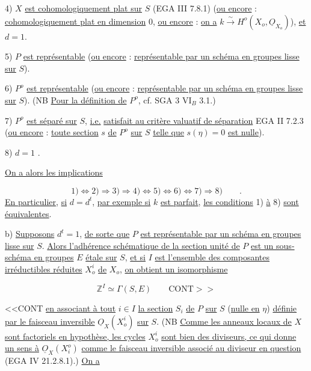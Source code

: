 
4) $X$ \underline{est cohomologiquement plat sur} $S$ (EGA III 7.8.1) (\underline{ou encore} : \underline{cohomologiquement plat en dimension} $0$, \underline{ou encore} : \underline{on a} $k \stackrel{\sim}{\longrightarrow} H^o(X_o,\underline{O}_{X_o})$), \underline{et} $d=1$.

5) $P$ \underline{est représentable} (\underline{ou encore} : \underline{représentable par un schéma en groupes lisse sur} $S$).

6) $P^o$ \underline{est représentable} (\underline{ou encore} : \underline{représentable par un schéma en groupes lisse sur} $S$). (NB \underline{Pour la définition de} $P^o$, cf. SGA 3 $\mathrm{VI}_B$ 3.1.)

7) $P^o$ \underline{est séparé sur} $S$, \underline{i.e.} \underline{satisfait au critère valuatif de séparation} EGA II 7.2.3 (\underline{ou encore} : \underline{toute section} $s$ \underline{de} $P^o$ \underline{sur} $S$ \underline{telle que} $s(\eta) = 0$ \underline{est nulle}).

8) $d=1$ .

\underline{On a alors les implications}

\begin{equation}\tag{12.1.4}
1) \Longleftrightarrow 2) \Longrightarrow 3) \Longrightarrow 4) \Longleftrightarrow 5) \Longleftrightarrow 6) \Longleftrightarrow 7) \Longrightarrow 8) \qquad .
\end{equation}
\underline{En particulier}, \underline{si} $d=d^t$, \underline{par exemple si} $k$ \underline{est parfait}, \underline{les conditions} 1) \underline{à} 8) \underline{sont équivalentes}.

b) \underline{Supposons} $d^t=1$, \underline{de sorte que} $P$ \underline{est représentable par un schéma en groupes lisse sur} $S$. \underline{Alors l'adhérence schématique de la section unité de} $P$ \underline{est un sous-schéma en groupes} $E$ \underline{étale sur} $S$, \underline{et si} $I$ \underline{est l'ensemble des composantes irréductibles réduites} $X_o^i$ \underline{de} $X_o$, \underline{on obtient un isomorphisme}

\begin{equation}\tag{12.1.5}
\mathbb{Z}^I \simeq \Gamma(S,E) \qquad \mathrm{CONT{>}{>}}
\end{equation}


<<CONT \underline{en associant à tout} $i \in I$ \underline{la section} $S_i$ \underline{de} $P$ \underline{sur} $S$ (\underline{nulle en} $\eta$) \underline{définie par le faisceau inversible} $\underline{O}_X(X_o^i)$ \underline{sur} $S$. (NB \underline{Comme les anneaux locaux de} $X$ \underline{sont factoriels en hypothèse, les cycles} $X_o^i$ \underline{sont bien des diviseurs, ce qui donne un sens à} $\underline{O}_X(X_i^o)$ \underline{comme le faisceau inversible associé au diviseur en question} (EGA IV 21.2.8.1).) \underline{On a}

